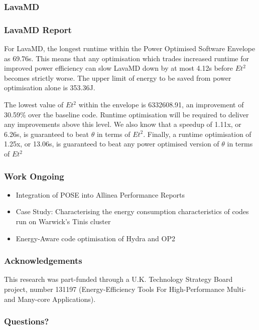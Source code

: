 \documentclass{beamer}
\begin{document}
  \begin{frame}
    \frametitle{LavaMD}
    \begin{figure}
    \providecommand{\plotwidth}{.8\linewidth}
    
    \end{figure}
  \end{frame}
  \begin{frame}
    \frametitle{LavaMD Report}
For LavaMD, the longest runtime within the Power Optimised Software Envelope as 69.76s.
This means that any optimisation which trades increased runtime for improved power efficiency can slow LavaMD down by at most 4.12s before $Et^2$ becomes strictly worse.
The upper limit of energy to be saved from power optimisation alone is 353.36J.

The lowest value of $Et^2$ within the envelope is 6332608.91, an improvement of 30.59\% over the baseline code.
Runtime optimisation will be required to deliver any improvements above this level.
We also know that a speedup of 1.11x, or 6.26s, is guaranteed to beat $\theta$ in terms of $Et^2$.
Finally, a runtime optimisation of 1.25x, or 13.06s, is guaranteed to beat any power optimised version of $\theta$ in terms of $Et^2$ 
  \end{frame}
  \begin{frame}
    \frametitle{Work Ongoing}
    \begin{itemize}
      \item{Integration of POSE into Allinea Performance Reports}
      \item{Case Study: Characterising the energy consumption characteristics of codes run on Warwick's Tinis cluster} 
      \item{Energy-Aware code optimisation of Hydra and OP2}
    \end{itemize}
  \end{frame}

  \begin{frame}
    \frametitle{Acknowledgements}
      This research was part-funded through a U.K. Technology Strategy Board  project, number 131197 (Energy-Efficiency Tools For High-Performance Multi- and Many-core Applications).


  \end{frame}

  \begin{frame}
    \frametitle{Questions?}
  \end{frame}
\end{document}
